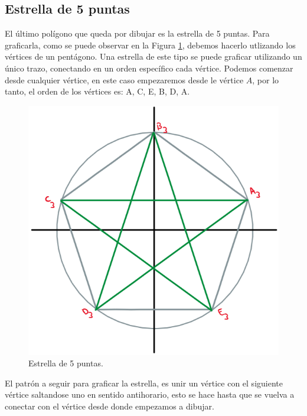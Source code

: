 \documentclass[oneside, a4paper]{article}
\begin{document}
        \subsection{Estrella de 5 puntas}

            El último polígono que queda por dibujar es la estrella de 5 puntas. Para graficarla, como se puede observar en la Figura \ref{fig:five_pointed_star}, debemos hacerlo utlizando los vértices de un pentágono. Una estrella de este tipo se puede graficar utilizando un único trazo, conectando en un orden específico cada vértice. Podemos comenzar desde cualquier vértice, en este caso empezaremos desde le vértice $A$, por lo tanto, el orden de los vértices es: A, C, E, B, D, A.

            \begin{figure}[H]
                \centering
                \includegraphics[scale=0.5]{five_pointed_star.png}
                \caption{Estrella de 5 puntas.}
                \label{fig:five_pointed_star}
            \end{figure}

            El patrón a seguir para graficar la estrella, es unir un vértice con el siguiente vértice saltandose uno en sentido antihorario, esto se hace hasta que se vuelva a conectar con el vértice desde donde empezamos a dibujar.
\end{document}
